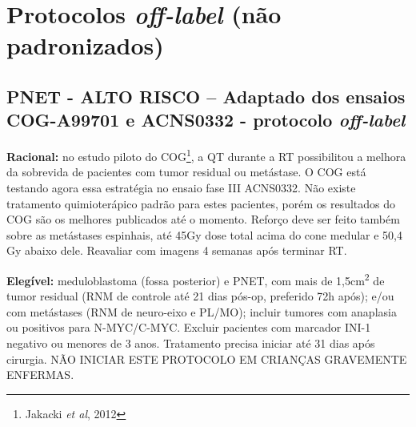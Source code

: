 \documentclass[11pt,a4paper,oldfontcommands]{memoir}
\begin{document}
  
\cleardoublepage
\chapter{Protocolos \textit{off-label} (não padronizados)}

\cleardoublepage

\section{PNET - ALTO RISCO -- Adaptado dos ensaios COG-A99701 e ACNS0332 - protocolo \textit{off-label}}
{\let\thefootnote\relax{}}
\textbf{Racional:} no estudo piloto do COG\footnote{Jakacki \textit{et al}, 2012}, a QT durante a RT possibilitou a melhora da sobrevida de pacientes com tumor residual ou metástase. O COG está testando agora essa estratégia no ensaio fase III ACNS0332. Não existe tratamento quimioterápico padrão para estes pacientes, porém os resultados do COG são os melhores publicados até o momento. Reforço deve ser feito também sobre as metástases espinhais, até 45Gy dose total acima do cone medular e 50,4 Gy abaixo dele. Reavaliar com imagens 4 semanas após terminar RT.

\textbf{Elegível:} meduloblastoma (fossa posterior) e PNET, com mais de 1,5cm\textsuperscript{2} de tumor residual (RNM de controle até 21 dias pós-op, preferido 72h após); e/ou com metástases (RNM de neuro-eixo e PL/MO); incluir tumores com anaplasia ou positivos para N-MYC/C-MYC. Excluir pacientes com marcador INI-1 negativo ou menores de 3 anos. Tratamento precisa iniciar até 31 dias após cirurgia. NÃO INICIAR ESTE PROTOCOLO EM CRIANÇAS GRAVEMENTE ENFERMAS.
\end{document}
